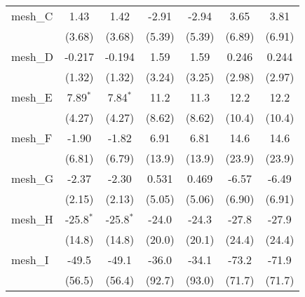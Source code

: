 \begin{tabular}{lcccccc}
   mesh\_C                                                     & 1.43          & 1.42          & -2.91         & -2.94         & 3.65           & 3.81\\   
                                                               & (3.68)        & (3.68)        & (5.39)        & (5.39)        & (6.89)         & (6.91)\\   
   mesh\_D                                                     & -0.217        & -0.194        & 1.59          & 1.59          & 0.246          & 0.244\\   
                                                               & (1.32)        & (1.32)        & (3.24)        & (3.25)        & (2.98)         & (2.97)\\   
   mesh\_E                                                     & 7.89$^{*}$    & 7.84$^{*}$    & 11.2          & 11.3          & 12.2           & 12.2\\   
                                                               & (4.27)        & (4.27)        & (8.62)        & (8.62)        & (10.4)         & (10.4)\\   
   mesh\_F                                                     & -1.90         & -1.82         & 6.91          & 6.81          & 14.6           & 14.6\\   
                                                               & (6.81)        & (6.79)        & (13.9)        & (13.9)        & (23.9)         & (23.9)\\   
   mesh\_G                                                     & -2.37         & -2.30         & 0.531         & 0.469         & -6.57          & -6.49\\   
                                                               & (2.15)        & (2.13)        & (5.05)        & (5.06)        & (6.90)         & (6.91)\\   
   mesh\_H                                                     & -25.8$^{*}$   & -25.8$^{*}$   & -24.0         & -24.3         & -27.8          & -27.9\\   
                                                               & (14.8)        & (14.8)        & (20.0)        & (20.1)        & (24.4)         & (24.4)\\   
   mesh\_I                                                     & -49.5         & -49.1         & -36.0         & -34.1         & -73.2          & -71.9\\   
                                                               & (56.5)        & (56.4)        & (92.7)        & (93.0)        & (71.7)         & (71.7)\\   

\end{tabular}
